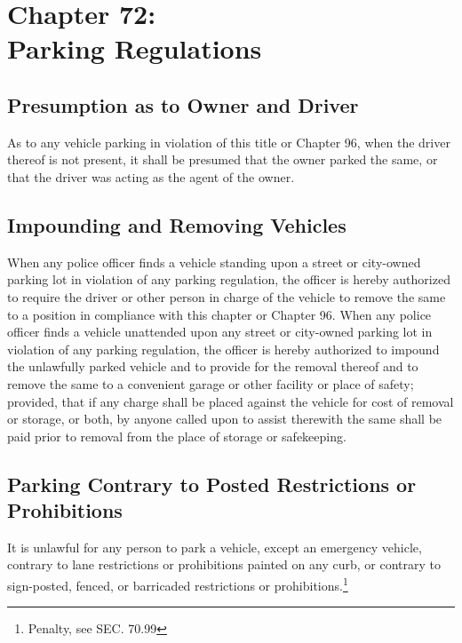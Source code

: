 \chapter*{Chapter 72: \\
	Parking Regulations}
    \vfill
    \minitoc
    \pagebreak



\section{Presumption as to Owner and Driver}
As to any vehicle parking in violation of this title or Chapter 96, when the driver thereof is not present, it shall be presumed that the owner parked the same, or that the driver was acting as the agent of the owner.

\section{Impounding and Removing Vehicles}
When any police officer finds a vehicle standing upon a street or city-owned parking lot in violation of any parking regulation, the officer is hereby authorized to require the driver or other person in charge of the vehicle to remove the same to a position in compliance with this chapter or Chapter 96. When any police officer finds a vehicle unattended upon any street or city-owned parking lot in violation of any parking regulation, the officer is hereby authorized to impound the unlawfully parked vehicle and to provide for the removal thereof and to remove the same to a convenient garage or other facility or place of safety; provided, that if any charge shall be placed against the vehicle for cost of removal or storage, or both, by anyone called upon to assist therewith the same shall be paid prior to removal from the place of storage or safekeeping.\\



\setcounter{section}{14}
\section{Parking Contrary to Posted Restrictions or Prohibitions}
It is unlawful for any person to park a vehicle, except an emergency vehicle, contrary to lane restrictions or prohibitions painted on any curb, or contrary to sign-posted, fenced, or barricaded restrictions or prohibitions.\footnote{Penalty, see SEC. 70.99}

